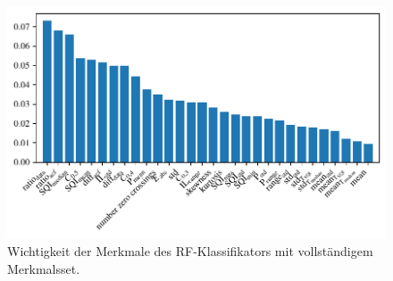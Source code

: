 \begin{figure}[H]
	\centering
	\includegraphics[scale=0.95]{pic/rf-clf-all-importances.pdf}
 	\caption{Wichtigkeit der Merkmale des \ac{RF}-Klassifikators mit vollständigem Merkmalsset.}
 	\label{fig:rf-clf-all-importances}
\end{figure}

